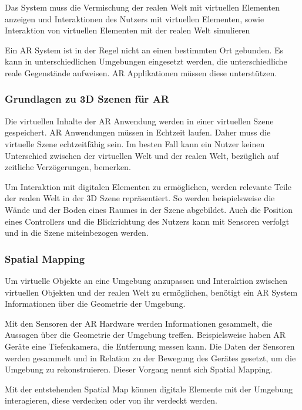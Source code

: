 Das System muss die Vermischung der realen Welt mit virtuellen Elementen anzeigen und Interaktionen des Nutzers mit virtuellen Elementen, sowie Interaktion von virtuellen Elementen mit der realen Welt simulieren

Ein AR System ist in der Regel nicht an einen bestimmten Ort gebunden. Es kann in unterschiedlichen Umgebungen eingesetzt werden, die unterschiedliche reale Gegenstände aufweisen. AR Applikationen müssen diese unterstützen.\citep{GrundlagenAR}


\subsubsection{Grundlagen zu 3D Szenen für AR}

Die virtuellen Inhalte der AR Anwendung werden in einer virtuellen Szene gespeichert. 
AR Anwendungen müssen in Echtzeit laufen. Daher muss die virtuelle Szene echtzeitfähig sein.
Im besten Fall kann ein Nutzer keinen Unterschied zwischen der virtuellen Welt und der realen Welt, bezüglich auf zeitliche Verzögerungen, bemerken.

Um Interaktion mit digitalen Elementen zu ermöglichen, werden relevante Teile der realen Welt in der 3D Szene repräsentiert. 
So werden beispielsweise die Wände und der Boden eines Raumes in der Szene abgebildet. Auch die Position eines Controllers und die Blickrichtung des Nutzers kann mit Sensoren verfolgt und in die Szene miteinbezogen werden.

\subsubsection{Spatial Mapping} 
Um virtuelle Objekte an eine Umgebung anzupassen und Interaktion zwischen virtuellen Objekten und der realen Welt zu ermöglichen, benötigt ein AR System Informationen über die Geometrie der Umgebung.

Mit den Sensoren der AR Hardware werden Informationen gesammelt, die Aussagen über die Geometrie der Umgebung treffen. Beispielsweise haben AR Geräte eine Tiefenkamera, die Entfernung messen kann. Die Daten der Sensoren werden gesammelt und in Relation zu der Bewegung des Gerätes gesetzt, um die Umgebung zu rekonstruieren. Dieser Vorgang nennt sich Spatial Mapping. 

Mit der entstehenden Spatial Map können digitale Elemente mit der Umgebung interagieren, diese verdecken oder von ihr verdeckt werden.\citep{spatialMapping} 

